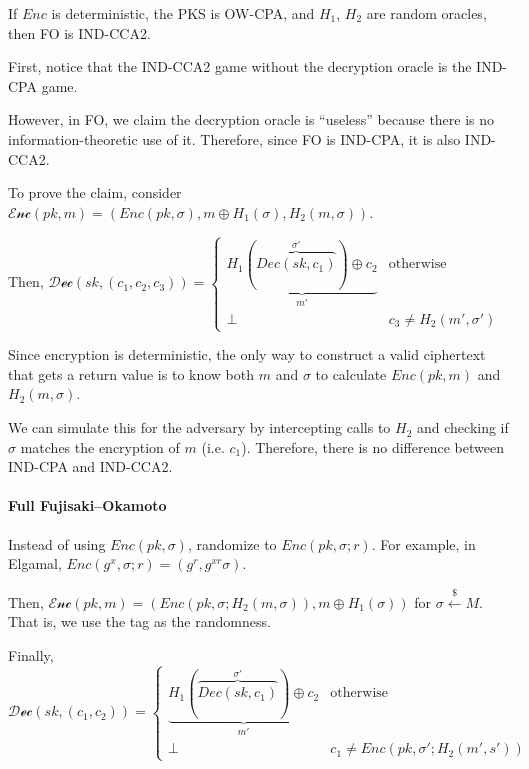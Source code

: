 \documentclass[notes]{agony}
\newcommand{\xgets}{\xleftarrow}
\newcommand{\ndgets}{\xgets{\mathdollar}}
\begin{document}
\begin{theorem}
  If $Enc$ is deterministic, the PKS is OW-CPA, and $H_1$, $H_2$ are random oracles,
  then FO is IND-CCA2.
\end{theorem}
\begin{prf}
  First, notice that the IND-CCA2 game
  without the decryption oracle is the IND-CPA game.

  However, in FO, we claim the decryption oracle is ``useless''
  because there is no information-theoretic use of it.
  Therefore, since FO is IND-CPA, it is also IND-CCA2.

  To prove the claim, consider $\mathcal{Enc}(pk,m) = (Enc(pk,\sigma), m\oplus H_1(\sigma), H_2(m,\sigma))$.

  Then, $\mathcal{Dec}(sk, (c_1,c_2,c_3)) = \begin{cases}
      \underbrace{H_1(\overbrace{Dec(sk, c_1)}^{\sigma'}) \oplus c_2}_{m'} & \text{otherwise}          \\
      \bot                                                                 & c_3 \neq H_2(m', \sigma')
    \end{cases}$

  Since encryption is deterministic,
  the only way to construct a valid ciphertext that gets a return value
  is to know both $m$ and $\sigma$ to calculate $Enc(pk,m)$ and $H_2(m,\sigma)$.

  We can simulate this for the adversary by intercepting calls to $H_2$
  and checking if $\sigma$ matches the encryption of $m$ (i.e. $c_1$).
  Therefore, there is no difference between IND-CPA and IND-CCA2.
\end{prf}

\paragraph{Full Fujisaki--Okamoto}
Instead of using $Enc(pk, \sigma)$,
randomize to $Enc(pk, \sigma; r)$.
For example, in Elgamal, $Enc(g^x, \sigma; r) = (g^r, g^{xr}\sigma)$.

Then, $\mathcal{Enc}(pk,m) = (Enc(pk,\sigma;H_2(m,\sigma)), m \oplus H_1(\sigma))$
for $\sigma \ndgets M$.
That is, we use the tag as the randomness.

Finally, $\mathcal{Dec}(sk, (c_1,c_2)) = \begin{cases}
    \underbrace{H_1(\overbrace{Dec(sk, c_1)}^{\sigma'}) \oplus c_2}_{m'} & \text{otherwise}                      \\
    \bot                                                                 & c_1 \neq Enc(pk, \sigma'; H_2(m',s'))
  \end{cases}$
\end{document}
